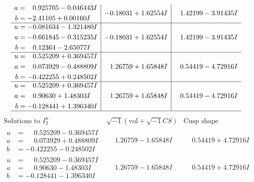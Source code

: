 \documentclass[1p]{elsarticle_modified}
\theoremstyle{definition}
\newcommand{\I}{\sqrt{-1}}
\begin{document}
$$\begin{array}{c|c|c}
\begin{aligned}
a &= \phantom{-}0.925705 - 0.046443 I \\
b &= -2.41105 + 0.00160 I\end{aligned}
 & -0.18031 + 1.62554 I & \phantom{-}1.42199 - 3.91435 I \\ \hline\begin{aligned}
u &= -0.081634 - 1.321480 I \\
a &= -0.661845 - 0.315235 I \\
b &= \phantom{-}0.12364 - 2.65077 I\end{aligned}
 & -0.18031 + 1.62554 I & \phantom{-}1.42199 - 3.91435 I \\ \hline\begin{aligned}
u &= \phantom{-}0.525209 + 0.369457 I \\
a &= \phantom{-}0.073929 - 0.488809 I \\
b &= -0.422255 + 0.248502 I\end{aligned}
 & \phantom{-}1.26759 + 1.65848 I & \phantom{-}0.54419 - 4.72916 I \\ \hline\begin{aligned}
u &= \phantom{-}0.525209 + 0.369457 I \\
a &= \phantom{-}0.90630 + 1.48303 I \\
b &= -0.128441 + 1.396340 I\end{aligned}
 & \phantom{-}1.26759 + 1.65848 I & \phantom{-}0.54419 - 4.72916 I\\
 \hline 
 \end{array}$$\newpage$$\begin{array}{c|c|c}  
\text{Solutions to }I^u_{2}& \I (\text{vol} + \sqrt{-1}CS) & \text{Cusp shape}\\
 \hline 
\begin{aligned}
u &= \phantom{-}0.525209 - 0.369457 I \\
a &= \phantom{-}0.073929 + 0.488809 I \\
b &= -0.422255 - 0.248502 I\end{aligned}
 & \phantom{-}1.26759 - 1.65848 I & \phantom{-}0.54419 + 4.72916 I \\ \hline\begin{aligned}
u &= \phantom{-}0.525209 - 0.369457 I \\
a &= \phantom{-}0.90630 - 1.48303 I \\
b &= -0.128441 - 1.396340 I\end{aligned}
 & \phantom{-}1.26759 - 1.65848 I & \phantom{-}0.54419 + 4.72916 I \\ \hline\begin{aligned}

\end{aligned}
\end{array}$$
\end{document}

